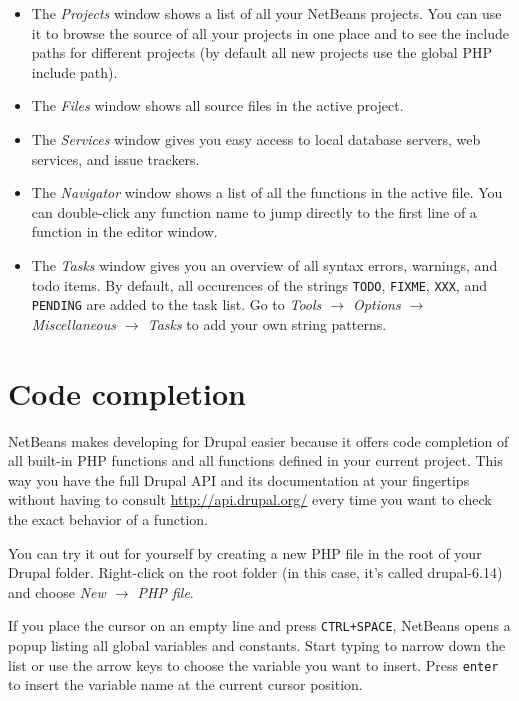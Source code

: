 \documentclass[ebook,10pt,twoside,openright]{memoir}
\begin{document}
\begin{itemize}
\item The \emph{Projects} window shows a list of all your NetBeans projects. You can use it to browse the source of all your projects in one place and to see the include paths for different projects (by default all new projects use the global PHP include path).
\item The \emph{Files} window shows all source files in the active project.
\item The \emph{Services} window gives you easy access to local database servers, web services, and issue trackers.
\item The \emph{Navigator} window shows a list of all the functions in the active file. You can double-click any function name to jump directly to the first line of a function in the editor window.
\item The \emph{Tasks} window gives you an overview of all syntax errors, warnings, and todo items. By default, all occurences of the strings \verb!TODO!, \verb!FIXME!, \verb!XXX!, and \verb!PENDING! are added to the task list. Go to \emph{Tools $\rightarrow$ Options $\rightarrow$ Miscellaneous $\rightarrow$ Tasks} to add your own string patterns.
\end{itemize}

\section{Code completion}

NetBeans makes developing for Drupal easier because it offers code completion of all built-in PHP functions and all functions defined in your current project. This way you have the full Drupal API and its documentation at your fingertips without having to consult \url{http://api.drupal.org/} every time you want to check the exact behavior of a function.

You can try it out for yourself by creating a new PHP file in the root of your Drupal folder. Right-click on the root folder (in this case, it’s called drupal-6.14) and choose \emph{New $\rightarrow$ PHP file}.

If you place the cursor on an empty line and press \verb!CTRL+SPACE!, NetBeans opens a popup listing all global variables and constants. Start typing to narrow down the list or use the arrow keys to choose the variable you want to insert. Press \verb!enter! to insert the variable name at the current cursor position.
\end{document}
